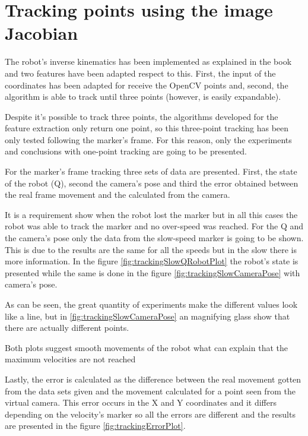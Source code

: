 

\chapter{Tracking points using the image Jacobian} %
\label{chap:tracking_points_using_the_image_jacobian}
The robot's inverse kinematics has been implemented as explained in the book and two features have been adapted respect to this. 
First, the input of the coordinates has been adapted for receive the OpenCV points and, second, the algorithm is able to track until three points (however, is easily expandable).

Despite it's possible to track three points, the algorithms developed for the feature extraction only return one point, so this three-point tracking has been only tested following the marker's frame. 
For this reason, only the experiments and conclusions with one-point tracking are going to be presented.

For the marker's frame tracking three sets of data are presented. 
First, the state of the robot (Q), second the camera's pose and third the error obtained between the real frame movement and the calculated from the camera.

It is a requirement show when the robot lost the marker but in all this cases the robot was able to track the marker and no over-speed was reached. 
For the Q and the camera's pose only the data from the slow-speed marker is going to be shown. 
This is due to the results are the same for all the speeds but in the slow there is more information.
In the figure \ref{fig:trackingSlowQRobotPlot} the robot's state is presented while the same is done in the figure \ref{fig:trackingSlowCameraPose} with camera's pose.

	\trackingSlowQRobotPlot
	\trackingSlowCameraPose

As can be seen, the great quantity of experiments make the different values look like a line, but in \ref{fig:trackingSlowCameraPose} an magnifying glass show that there are actually different points.

Both plots suggest smooth movements of the robot what can explain that the maximum velocities are not reached

Lastly, the error is calculated as the difference between the real movement gotten from the data sets given and the movement calculated for a point seen from the virtual camera.
This error occurs in the X and Y coordinates and it differs depending on the velocity's marker so all the errors are different and the results are presented in the figure \ref{fig:trackingErrorPlot}.

